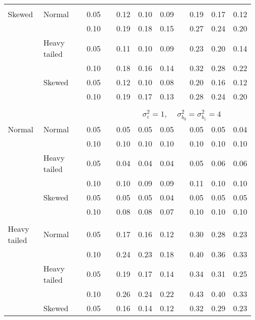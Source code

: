 \begin{table}[ht]
\begin{scriptsize}
\begin{center}
\begin{tabular}{ll p{.1cm} c p{.1cm} rrr p{.1cm} rrr}
             &&&&&&&&&&&\\
Skewed       & Normal       && 0.05 &&  0.12 & 0.10 & 0.09 && 0.19 & 0.17 & 0.12 \\ 
             &              && 0.10 &&  0.19 & 0.18 & 0.15 && 0.27 & 0.24 & 0.20 \\ 
             & Heavy tailed && 0.05 &&  0.11 & 0.10 & 0.09 && 0.23 & 0.20 & 0.14 \\ 
             &              && 0.10 &&  0.18 & 0.16 & 0.14 && 0.32 & 0.28 & 0.22 \\ 
             & Skewed       && 0.05 &&  0.12 & 0.10 & 0.08 && 0.20 & 0.16 & 0.12 \\ 
             &              && 0.10 &&  0.19 & 0.17 & 0.13 && 0.28 & 0.24 & 0.20 \\ 


&&&&&&&&&&&\\
& && && \multicolumn{7}{c}{$\sigma_{\varepsilon}^2 = 1$, \ \ $\sigma_{b_0}^2 = \sigma_{b_1}^2 = 4$} \\ \cline{6-12}
\rowcolor{gray!20}Normal       & Normal       && 0.05 &&  0.05 & 0.05 & 0.05 && 0.05 & 0.05 & 0.04 \\ 
\rowcolor{gray!20}             &              && 0.10 &&  0.10 & 0.10 & 0.10 && 0.10 & 0.10 & 0.10 \\ 
\rowcolor{gray!20}             & Heavy tailed && 0.05 &&  0.04 & 0.04 & 0.04 && 0.05 & 0.06 & 0.06 \\ 
\rowcolor{gray!20}             &              && 0.10 &&  0.10 & 0.09 & 0.09 && 0.11 & 0.10 & 0.10 \\ 
\rowcolor{gray!20}             & Skewed       && 0.05 &&  0.05 & 0.05 & 0.04 && 0.05 & 0.05 & 0.05 \\ 
\rowcolor{gray!20}             &              && 0.10 &&  0.08 & 0.08 & 0.07 && 0.10 & 0.10 & 0.10 \\ 
             &&&&&&&&&&&\\
Heavy tailed & Normal       && 0.05 &&  0.17 & 0.16 & 0.12 && 0.30 & 0.28 & 0.23 \\ 
             &              && 0.10 &&  0.24 & 0.23 & 0.18 && 0.40 & 0.36 & 0.33 \\ 
             & Heavy tailed && 0.05 &&  0.19 & 0.17 & 0.14 && 0.34 & 0.31 & 0.25 \\ 
             &              && 0.10 &&  0.26 & 0.24 & 0.22 && 0.43 & 0.40 & 0.33 \\ 
             & Skewed       && 0.05 &&  0.16 & 0.14 & 0.12 && 0.32 & 0.29 & 0.23 \\ 

\end{tabular}
\end{center}
\end{scriptsize}
\end{table}

